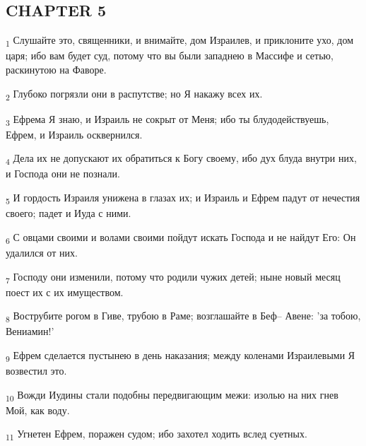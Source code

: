 \subsection{CHAPTER 5}
\begin{tcolorbox}
\textsubscript{1} Слушайте это, священники, и внимайте, дом Израилев, и приклоните ухо, дом царя; ибо вам будет суд, потому что вы были западнею в Массифе и сетью, раскинутою на Фаворе.
\end{tcolorbox}
\begin{tcolorbox}
\textsubscript{2} Глубоко погрязли они в распутстве; но Я накажу всех их.
\end{tcolorbox}
\begin{tcolorbox}
\textsubscript{3} Ефрема Я знаю, и Израиль не сокрыт от Меня; ибо ты блудодействуешь, Ефрем, и Израиль осквернился.
\end{tcolorbox}
\begin{tcolorbox}
\textsubscript{4} Дела их не допускают их обратиться к Богу своему, ибо дух блуда внутри них, и Господа они не познали.
\end{tcolorbox}
\begin{tcolorbox}
\textsubscript{5} И гордость Израиля унижена в глазах их; и Израиль и Ефрем падут от нечестия своего; падет и Иуда с ними.
\end{tcolorbox}
\begin{tcolorbox}
\textsubscript{6} С овцами своими и волами своими пойдут искать Господа и не найдут Его: Он удалился от них.
\end{tcolorbox}
\begin{tcolorbox}
\textsubscript{7} Господу они изменили, потому что родили чужих детей; ныне новый месяц поест их с их имуществом.
\end{tcolorbox}
\begin{tcolorbox}
\textsubscript{8} Вострубите рогом в Гиве, трубою в Раме; возглашайте в Беф-- Авене: 'за тобою, Вениамин!'
\end{tcolorbox}
\begin{tcolorbox}
\textsubscript{9} Ефрем сделается пустынею в день наказания; между коленами Израилевыми Я возвестил это.
\end{tcolorbox}
\begin{tcolorbox}
\textsubscript{10} Вожди Иудины стали подобны передвигающим межи: изолью на них гнев Мой, как воду.
\end{tcolorbox}
\begin{tcolorbox}
\textsubscript{11} Угнетен Ефрем, поражен судом; ибо захотел ходить вслед суетных.
\end{tcolorbox}
